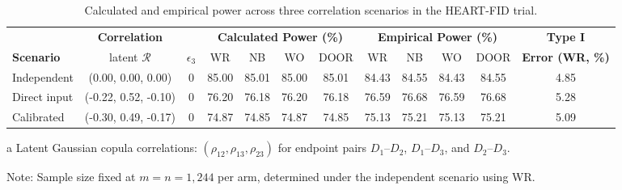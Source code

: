 \begin{table}[ht!]
\centering
\caption{Calculated and empirical power across three correlation scenarios in the HEART-FID trial.}
\label{tab:heartfid_power_scenarios}
\begin{threeparttable}
\setlength{\tabcolsep}{4.2pt}
\renewcommand{\arraystretch}{1.08}
\begin{tabular}{@{}l c c cccc cccc c@{}}
\toprule
& \multicolumn{1}{c}{\textbf{Correlation}} & & \multicolumn{4}{c}{\textbf{Calculated Power (\%)}} & \multicolumn{4}{c}{\textbf{Empirical Power (\%)}} & \textbf{Type I} \\
\cmidrule(lr){4-7} \cmidrule(lr){8-11}
\textbf{Scenario} & latent $\bm{\mathcal{R}}$\tnote{a} & $\epsilon_3$ & WR & NB & WO & DOOR & WR & NB & WO & DOOR & \textbf{Error (WR, \%)} \\
\midrule
Independent & (0.00, 0.00, 0.00) & 0 & 85.00 & 85.01 & 85.00 & 85.01 & 84.43 & 84.55 & 84.43 & 84.55 & 4.85 \\
Direct input & (-0.22, 0.52, -0.10) & 0 & 76.20 & 76.18 & 76.20 & 76.18 & 76.59 & 76.68 & 76.59 & 76.68 & 5.28 \\
Calibrated & (-0.30, 0.49, -0.17) & 0 & 74.87 & 74.85 & 74.87 & 74.85 & 75.13 & 75.21 & 75.13 & 75.21 & 5.09 \\
\bottomrule
\end{tabular}
\begin{tablenotes}\footnotesize
\item[a] Latent Gaussian copula correlations: $(\rho_{12}, \rho_{13}, \rho_{23})$ for endpoint pairs $D_1$--$D_2$, $D_1$--$D_3$, and $D_2$--$D_3$.
\item Note: Sample size fixed at $m=n=1,244$ per arm, determined under the independent scenario using WR.
\end{tablenotes}
\end{threeparttable}
\end{table}
